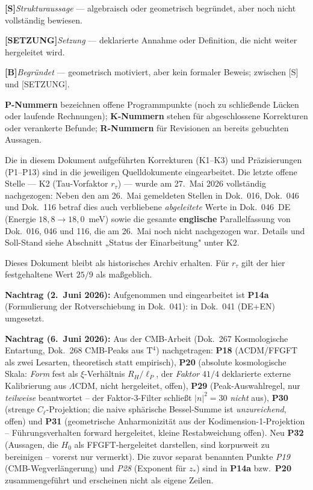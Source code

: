 \smallskip\noindent \textbf{[S]}\quad \emph{Strukturaussage} — algebraisch oder geometrisch begründet, aber noch nicht vollständig bewiesen.

\smallskip\noindent \textbf{[SETZUNG]}\quad \emph{Setzung} — deklarierte Annahme oder Definition, die nicht weiter hergeleitet wird.

\smallskip\noindent \textbf{[B]}\quad \emph{Begründet} — geometrisch motiviert, aber kein formaler Beweis; zwischen [S] und [SETZUNG].

\medskip


\smallskip
\noindent\textbf{P-Nummern} bezeichnen offene Programmpunkte (noch zu
schließende Lücken oder laufende Rechnungen); \textbf{K-Nummern} stehen
für abgeschlossene Korrekturen oder verankerte Befunde; \textbf{R-Nummern}
für Revisionen an bereits gebuchten Aussagen.

\medskip
Die in diesem Dokument aufgeführten Korrekturen (K1–K3) und
Präzisierungen (P1–P13) sind in die jeweiligen Quelldokumente
eingearbeitet. Die letzte offene Stelle --- K2 (Tau-Vorfaktor
$r_\tau$) --- wurde am 27.~Mai 2026 vollständig nachgezogen: Neben den am
26.~Mai gemeldeten Stellen in Dok.~016, Dok.~046 und Dok.~116 betraf dies
auch verbliebene \emph{abgeleitete} Werte in Dok.~046~DE (Energie
$18{,}8 \to 18{,}0$~meV) sowie die gesamte \textbf{englische} Parallelfassung
von Dok.~016, 046 und 116, die am 26.~Mai noch nicht nachgezogen war.
Details und Soll-Stand siehe Abschnitt „Status der Einarbeitung" unter K2.

Dieses Dokument bleibt als historisches Archiv erhalten.
Für $r_\tau$ gilt der hier festgehaltene Wert $25/9$ als maßgeblich.

\medskip

\textbf{Nachtrag (2.~Juni 2026):} Aufgenommen und eingearbeitet ist \textbf{P14a}
(Formulierung der Rotverschiebung in Dok.~041): in Dok.~041 (DE+EN) umgesetzt.

\medskip

\textbf{Nachtrag (6.~Juni 2026):} Aus der CMB-Arbeit (Dok.~267 Kosmologische
Entartung, Dok.~268 CMB-Peaks aus T$^4$) nachgetragen: \textbf{P18}
(ΛCDM/FFGFT als zwei Lesarten, theoretisch statt empirisch),
\textbf{P20} (absolute kosmologische Skala: \emph{Form} fest als $\xi$-Verhältnis $R_H/\ell_P$, der \emph{Faktor} $41/4$ deklarierte externe Kalibrierung aus $\Lambda$CDM, nicht hergeleitet, offen), \textbf{P29} (Peak-Auswahlregel,
nur \emph{teilweise} beantwortet -- der Faktor-3-Filter schließt $|n|^2=30$
\emph{nicht} aus), \textbf{P30} (strenge $C_\ell$-Projektion; die naive
sphärische Bessel-Summe ist \emph{unzureichend}, offen) und \textbf{P31}
(geometrische Anharmonizität aus der Kodimension-1-Projektion -- Führungsverhalten
forward hergeleitet, kleine Restabweichung offen). Neu \textbf{P32} (Aussagen, die $H_0$ als FFGFT-hergeleitet darstellen, sind korpusweit zu bereinigen -- vorerst nur vermerkt). Die zuvor separat benannten Punkte
\emph{P19} (CMB-Wegverlängerung) und \emph{P28} (Exponent für $z_*$) sind in
\textbf{P14a} bzw.\ \textbf{P20} zusammengeführt und erscheinen nicht als
eigene Zeilen.

